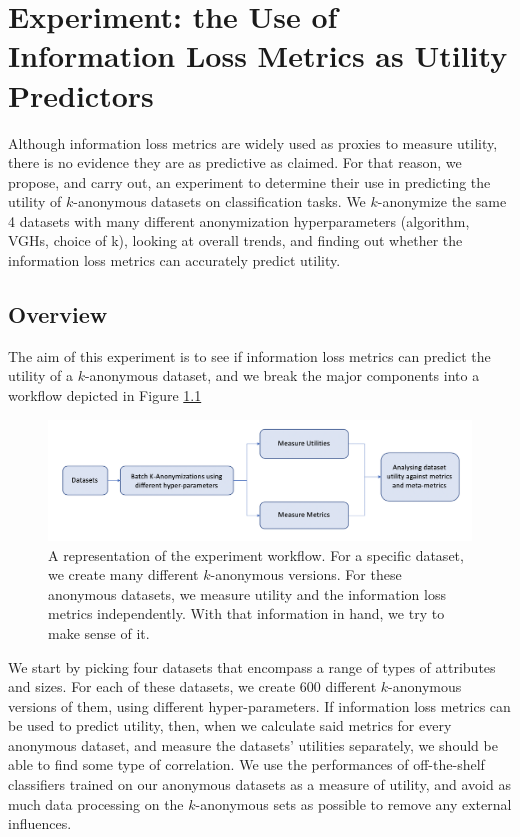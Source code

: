 \chapter{Experiment: the Use of Information Loss Metrics as Utility Predictors}
Although information loss metrics are widely used as proxies to measure utility, there is no evidence they are as predictive as claimed. For that reason, we propose, and carry out, an experiment to determine their use in predicting the utility of $k$-anonymous datasets on classification tasks. We $k$-anonymize the same 4 datasets with many different anonymization hyperparameters (algorithm, VGHs, choice of k), looking at overall trends, and finding out whether the information loss metrics can accurately predict utility.


\section{Overview}
The aim of this experiment is to see if information loss metrics can predict the utility of a $k$-anonymous dataset, and we break the major components into a workflow depicted in Figure \ref{fig:workflow}

\begin{figure}[h]
    \centering
    \includegraphics[width=\textwidth]{project/fig/overview.png}
    \caption{A representation of the experiment workflow. For a specific dataset, we create many different $k$-anonymous versions. For these anonymous datasets, we measure utility and the information loss metrics independently. With that information in hand, we try to make sense of it.}
    \label{fig:workflow}
\end{figure}

We start by picking four datasets that encompass a range of types of attributes and sizes. For each of these datasets, we create $600$ different $k$-anonymous versions of them, using different hyper-parameters. If information loss metrics can be used to predict utility, then, when we calculate said metrics for every anonymous dataset, and measure the datasets' utilities separately, we should be able to find some type of correlation. We use the performances of off-the-shelf classifiers trained on our anonymous datasets as a measure of utility, and avoid as much data processing on the $k$-anonymous sets as possible to remove any external influences.

